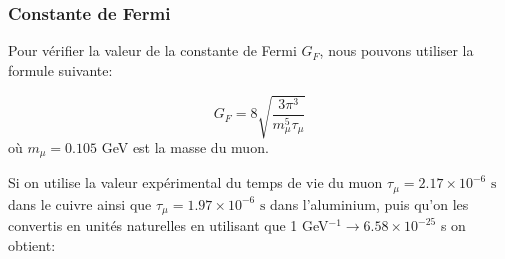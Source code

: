 \documentclass[12pt]{article}
\begin{document}

\subsubsection{Constante de Fermi}

Pour vérifier la valeur de la constante de Fermi $G_{F}$, nous pouvons utiliser la formule suivante:

\[ G_{F} =8\sqrt{\frac{3\pi^{3}}{m_{\mu}^{5}\tau_{\mu}}} \]
où $m_{\mu}=0.105$ GeV est la masse du muon.

Si on utilise la valeur expérimental du temps de vie du muon $\tau_{\mu}=2.17\times10^{-6} \text{ s}$ dans le cuivre ainsi que $\tau_{\mu}=1.97\times10^{-6} \text{ s}$ dans l'aluminium, puis qu'on les convertis en unités naturelles en utilisant que 1 GeV$^{-1}\rightarrow6.58\times10^{-25}$ s on obtient:
\end{document}
